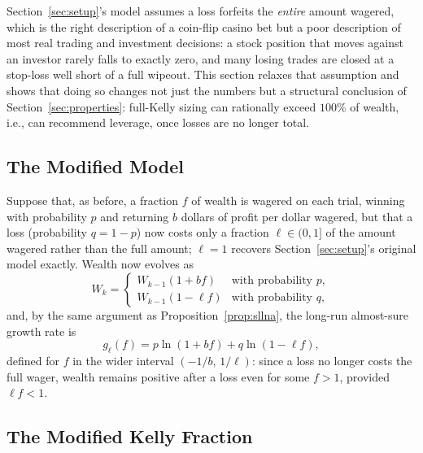 \documentclass[11pt]{article}
\theoremstyle{remark}
\theoremstyle{definition}
\begin{document}
Section~\ref{sec:setup}'s model assumes a loss forfeits the \emph{entire} amount wagered, which is the right description of a coin-flip casino bet but a poor description of most real trading and investment decisions: a stock position that moves against an investor rarely falls to exactly zero, and many losing trades are closed at a stop-loss well short of a full wipeout. This section relaxes that assumption and shows that doing so changes not just the numbers but a structural conclusion of Section~\ref{sec:properties}: full-Kelly sizing can rationally exceed $100\%$ of wealth, i.e., can recommend leverage, once losses are no longer total.

\subsection{The Modified Model}

Suppose that, as before, a fraction $f$ of wealth is wagered on each trial, winning with probability $p$ and returning $b$ dollars of profit per dollar wagered, but that a loss (probability $q=1-p$) now costs only a fraction $\ell \in (0,1]$ of the amount wagered rather than the full amount; $\ell=1$ recovers Section~\ref{sec:setup}'s original model exactly. Wealth now evolves as
\begin{equation}
W_k = \begin{cases} W_{k-1}(1+bf) & \text{with probability } p, \\ W_{k-1}(1-\ell f) & \text{with probability } q, \end{cases}
\label{eq:partial-recursion}
\end{equation}
and, by the same argument as Proposition~\ref{prop:sllna}, the long-run almost-sure growth rate is
\begin{equation}
g_\ell(f) = p\ln(1+bf) + q\ln(1-\ell f),
\label{eq:partial-g}
\end{equation}
defined for $f$ in the wider interval $(-1/b,\, 1/\ell)$: since a loss no longer costs the full wager, wealth remains positive after a loss even for some $f>1$, provided $\ell f<1$.

\subsection{The Modified Kelly Fraction}
\end{document}
